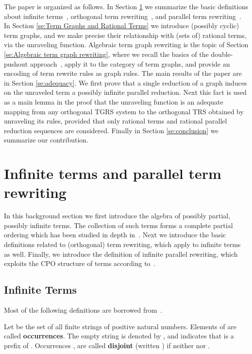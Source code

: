 \documentclass{eptcs}
\theoremstyle{plain}
\theoremstyle{definition}
\begin{document}
The paper is organized as follows. In Section 
\ref{se:term rewriting} we summarize the basic definitions about
infinite  terms~\cite{ADJ:IASCA}, orthogonal term rewriting~\cite{HL:CORS1},
and  parallel term rewriting~\cite{Cor:TRC}. 
In Section \ref{se:Term Graphs and Rational Terms} we introduce 
(possibly cyclic)
term graphs, and we make precise their relationship with (sets of)
rational terms, via the unraveling function. 
Algebraic term graph rewriting is the topic of Section
\ref{se:Algebraic term  graph rewriting}, where we recall the basics
of the  double-pushout approach~\cite{Ehr:TIAA}, apply it to the category
of term  graphs, and provide an encoding of term rewrite rules as
graph  rules. The main results of the paper are in Section
\ref{se:adequacy}.  We first prove that a single reduction of a graph
induces on the unraveled term a possibly infinite parallel
reduction. Next this fact is used as a main lemma in the proof that
the unraveling function is an adequate mapping from any orthogonal
TGRS system to the orthogonal TRS obtained by unraveling its rules,
provided that only rational terms and rational parallel  reduction
sequences  are considered.    
Finally in Section \ref{se:conclusion} we summarize our contribution.



\section{Infinite terms and parallel term rewriting}
\label{se:term rewriting}

In this background section we first introduce the algebra  
of  
possibly partial, possibly 
infinite terms. The collection of such terms forms a 
complete partial ordering which has been studied in depth in~\cite{ADJ:IASCA}. Next we introduce the basic definitions related to 
(orthogonal) term rewriting, which apply to infinite terms as well. 
Finally, we introduce the definition of 
infinite parallel rewriting, which exploits the CPO structure of terms 
according to~\cite{Cor:TRC}.


\subsection{Infinite Terms}
\label{ss:Infinite Terms}

Most of the following definitions are borrowed from~\cite{ADJ:IASCA}.

Let  be the set of all finite strings of
positive natural numbers. Elements of  are called {\bf 
occurrences}.
The empty string is denoted by , and  indicates that 
 is a prefix of . 
Occurrences
,  are called {\bf disjoint} (written ) if neither 
nor . 
\end{document}
